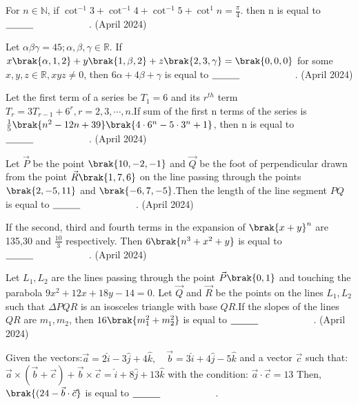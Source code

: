 \iffalse
\title{04-06-2024-shift-1-16-30}
\author{AI24BTECH11011 }
\section{mains}
\fi
        \item For $n \in \mathbb{N}$, if $\cot^{-1}3+\cot^{-1}4+\cot^{-1}5+\cot^{1}n=\frac{\pi}{4}$. then n is equal to $\makebox[3cm][l]{\underline{\hspace{1cm}}}$.
\hfill{(April 2024)} 
\item Let $\alpha\beta\gamma=45;\alpha,\beta,\gamma \in \mathbb{R}$. If $x\brak{\alpha,1,2}+y\brak{1,\beta,2}+z\brak{2,3,\gamma}=\brak{0,0,0}$ for some $x,y,z \in \mathbb{R},xyz \neq 0$, then $6\alpha+4\beta+\gamma$ is equal to $\makebox[3cm][l]{\underline{\hspace{1cm}}}$.
\hfill{(April 2024)} 
\item Let the first term of a series be $T_1=6$ and its $r^{th}$ term $T_r=3T_{r-1}+6^r,r=2,3,\cdots,n$.If sum of the first n terms of the series is $\frac{1}{5}\brak{n^2-12n+39}\brak{4\cdot6^n-5\cdot 3^n +1}$, then n is equal to $\makebox[3cm][l]{\underline{\hspace{1cm}}}$.
\hfill{(April 2024)} 
\item Let $\vec{P}$ be the point $\brak{10,-2,-1}$ and $\vec{Q}$ be the foot of perpendicular drawn from the point $\vec{R}\brak{1,7,6}$ on the line passing through the points $\brak{2,-5,11}$ and $\brak{-6,7,-5}$.Then the length of the line segment $PQ$ is equal to $\makebox[3cm][l]{\underline{\hspace{1cm}}}$.
\hfill{(April 2024)} 
\item If the second, third and fourth terms in the expansion of $\brak{x+y}^n$ are 135,30 and $\frac{10}{3}$ respectively. Then $6\brak{n^3+x^2+y}$ is equal to $\makebox[3cm][l]{\underline{\hspace{1cm}}}$.
\hfill{(April 2024)} 
\item Let $L_1,L_2$ are the lines passing through the point $\vec{P}\brak{0,1}$ and touching the parabola $9x^2+12x+18y-14=0$. Let $\vec{Q}$ and $\vec{R}$ be the points on the lines $L_1,L_2$ such that $\Delta PQR$ is an isosceles triangle with base $QR$.If the slopes of the lines $QR$ are $m_1,m_2$, then $16\brak{m_1^2+m_2^2}$ is equal to $\makebox[3cm][l]{\underline{\hspace{1cm}}}$.
\hfill{(April 2024)} 
\item Given the vectors:$\vec{a} = 2\hat{i} - 3\hat{j} + 4\hat{k}, \quad \vec{b} = 3\hat{i} + 4\hat{j} - 5\hat{k}$ and a vector $\vec{c}$ such that:$\vec{a} \times (\vec{b} + \vec{c}) + \vec{b} \times \vec{c} = \hat{i} + 8\hat{j} + 13\hat{k}$ with the condition: $\vec{a} \cdot \vec{c} = 13$ Then,  $\brak{( 24 - \vec{b} \cdot \vec{c} }$ is equal to $\makebox[3cm][l]{\underline{\hspace{1cm}}}$.
